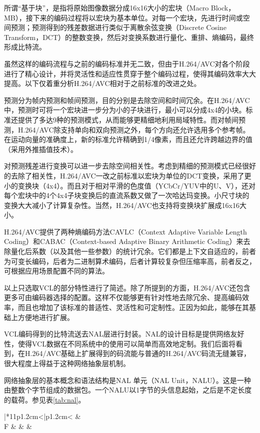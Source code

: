 所谓“基于块”，是指将原始图像数据分成16x16大小的宏块（Macro Block，MB），接下来的编码过程将以宏块为基本单位。对每一个宏块，先进行时间或空间预测；预测得到的残差数据进行类似于离散余弦变换（Discrete Cosine Transform，DCT）的整数变换，然后对变换系数进行量化、重排、熵编码，最终形成比特流。

虽然这样的编码流程与之前的编码标准并无二致，但由于H.264/AVC对各个阶段进行了精心设计，并将灵活性和适应性贯穿于整个编码过程，使得其编码效率大大提高。以下仅着重分析H.264/AVC相对于之前标准的改进之处。

预测分为帧内预测和帧间预测，目的分别是去除空间和时间冗余。在H.264/AVC中，预测时可将一个宏块进一步分为小的子块进行，最小可以分成4x4的小块。标准还提供了多达9种的预测模式，从而能够更精细地利用局域特性。而对帧间预测，H.264/AVC除支持单向和双向预测之外，每个方向还允许选用多个参考帧。在运动向量的准确度上，新的标准允许精确到1/4像素，而且还允许跨越边界的值（采用外推插值技术）。

对预测残差进行变换可以进一步去除空间相关性。考虑到精细的预测模式已经很好的去除了相关性，H.264/AVC一改之前标准以宏块为单位的DCT变换，采用了更小的变换块（4x4）。而且对于相对平滑的色度值（YCbCr/YUV中的U、V），还对每个宏块中的4个4x4子块变换后的直流系数又做了一次哈达玛变换。小尺寸块的变换大大减小了计算复杂性。当然，H.264/AVC也支持将变换块扩展成16x16大小。

H.264/AVC提供了两种熵编码方法CAVLC（Context Adaptive Variable Length Coding）和CABAC（Context-based Adaptive Binary Arithmetic Coding）来去除量化后系数（以及其他一些参数）的统计冗余。它们都是上下文自适应的，前者为可变长编码，后者为二进制算术编码，后者计算较复杂但压缩率高，前者反之，可根据应用场景配置不同的算法。

以上只选取VCL的部分特性进行了简述。除了所提到的方面，H.264/AVC还包含更多可由编码器选择的配置。这样不仅能够更有针对性地去除冗余、提高编码效率，而且也增加了该标准的普适性、灵活性和可定制性。正因为如此，能够在其基础上方便地进行扩展。

VCL编码得到的比特流送去NAL层进行封装。NAL的设计目标是提供网络友好性，使得VCL数据在不同系统中的使用可以简单而高效地定制。我们后面将看到，在H.264/AVC基础上扩展得到的码流能与普通的H.264/AVC码流无缝兼容，很大程度上得益于这种网络抽象层机制。

网络抽象层的基本概念和语法结构是NAL 单元（NAL Unit，NALU）。这是一种由整数个字节组成的数据包。一个NALU以1字节的头信息起始，之后是不定长度的载荷。参见表\ref{tab:nal}。

\begin{table}[h]
\centering
\caption{H.264/AVC中的NAL单元结构}
\label{tab:nal}
\begin{tabular}{|*{11}{p{1.2cm}<{\centering}|}{p{1.2cm}<{\centering}}}
	\hline
	 &  \\ \hline
	F &  &  &  \\ \hline
\end{tabular}
\end{table}

